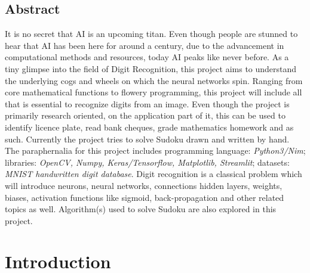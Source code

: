 \documentclass[12pt, a4paper]{report}
\begin{document}
\newpage
\vspace*{\fill}
\begin{center}
    \section*{\centering \huge Abstract}
    \label{sec:abstract}
\end{center}
It is no secret that AI is an upcoming titan. Even though people are stunned to hear that AI has been here for around a century, due to the advancement in computational methods and resources, today AI peaks like never before. As a tiny glimpse into the field of Digit Recognition, this project aims to understand the underlying cogs and wheels on which the neural networks spin. Ranging from core mathematical functions to flowery programming, this project will include all that is essential to recognize digits from an image. Even though the project is primarily research oriented, on the application part of it, this can be used to identify licence plate, read bank cheques, grade mathematics homework and as such. Currently the project tries to solve Sudoku drawn and written by hand. The paraphernalia for this project includes programming language: \textit{Python3/Nim}; libraries: \textit{OpenCV, Numpy, Keras/Tensorflow, Matplotlib, Streamlit}; datasets: \textit{MNIST handwritten digit database}. Digit recognition is a classical problem which will introduce neurons, neural networks, connections hidden layers, weights, biases, activation functions like sigmoid, back-propagation and other related topics as well. Algorithm(s) used to solve Sudoku are also explored in this project.
\vspace*{\fill}

{
    \hypersetup{hidelinks}

    \tableofcontents
    \thispagestyle{fancy}

    \listoffigures
    \thispagestyle{fancy}

}

\chapter{Introduction}
\label{chap:introduction}
\thispagestyle{fancy}
\end{document}
